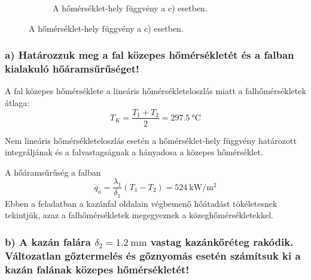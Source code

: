 \begin{figure}[h]
\begin{subfigure}[b]{0.31\textwidth}
		\caption{A hőmérséklet-hely függvény a c) esetben.}
	\end{subfigure}
\end{figure}

\subsubsection*{a) Határozzuk meg a fal közepes hőmérsékletét és a falban kialakuló hőáramsűrűséget!}

A fal közepes hőmérséklete a lineáris hőmérsékleteloszlás miatt a falhőmérsékletek átlaga:
\begin{equation}
	T_K = \frac{T_1 + T_2}{2} = \SI{297.5}{\celsius}
\end{equation}

Nem lineáris hőmérsékleteloszlás esetén a hőmérséklet-hely függvény határozott integráljának és a falvastagságnak a hányadosa a közepes hőmérséklet.

A hőáramsűrűség a falban
\begin{equation}
	\dot{q}_a = \frac{\lambda_1}{\delta_1} (T_1 - T_2) = \SI{524}{\kilo\watt\per\meter\squared}
\end{equation}
Ebben a feladatban a kazánfal oldalain végbemenő hőátadást tökéletesnek tekintjük, azaz a falhőmérsékletek megegyeznek a közeghőmérsékletekkel.

\subsubsection*{b) A kazán falára $\delta_2 = \SI{1.2}{\milli\meter}$ vastag kazánkőréteg rakódik. Változatlan gőztermelés és gőznyomás esetén számítsuk ki a kazán falának közepes hőmérsékletét!}

